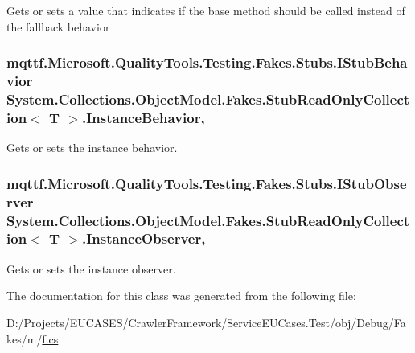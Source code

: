 Gets or sets a value that indicates if the base method should be called instead of the fallback behavior

\hypertarget{class_system_1_1_collections_1_1_object_model_1_1_fakes_1_1_stub_read_only_collection_3_01_t_01_4_ae43d07c5cca31ebc751bc6c4a55e9563}{
\subsubsection[{Instance\-Behavior}]{\setlength{\rightskip}{0pt plus 5cm}mqttf.\-Microsoft.\-Quality\-Tools.\-Testing.\-Fakes.\-Stubs.\-I\-Stub\-Behavior System.\-Collections.\-Object\-Model.\-Fakes.\-Stub\-Read\-Only\-Collection$<$ T $>$.Instance\-Behavior\hspace{0.3cm}{\ttfamily [get]}, {\ttfamily [set]}}}\label{class_system_1_1_collections_1_1_object_model_1_1_fakes_1_1_stub_read_only_collection_3_01_t_01_4_ae43d07c5cca31ebc751bc6c4a55e9563}


Gets or sets the instance behavior.

\hypertarget{class_system_1_1_collections_1_1_object_model_1_1_fakes_1_1_stub_read_only_collection_3_01_t_01_4_a6b64e20e7eca848d29fd1c34fcdbeb0c}{
\subsubsection[{Instance\-Observer}]{\setlength{\rightskip}{0pt plus 5cm}mqttf.\-Microsoft.\-Quality\-Tools.\-Testing.\-Fakes.\-Stubs.\-I\-Stub\-Observer System.\-Collections.\-Object\-Model.\-Fakes.\-Stub\-Read\-Only\-Collection$<$ T $>$.Instance\-Observer\hspace{0.3cm}{\ttfamily [get]}, {\ttfamily [set]}}}\label{class_system_1_1_collections_1_1_object_model_1_1_fakes_1_1_stub_read_only_collection_3_01_t_01_4_a6b64e20e7eca848d29fd1c34fcdbeb0c}


Gets or sets the instance observer.



The documentation for this class was generated from the following file\-:\begin{DoxyCompactItemize}
\item 
D\-:/\-Projects/\-E\-U\-C\-A\-S\-E\-S/\-Crawler\-Framework/\-Service\-E\-U\-Cases.\-Test/obj/\-Debug/\-Fakes/m/\hyperlink{m_2f_8cs}{f.\-cs}\end{DoxyCompactItemize}
